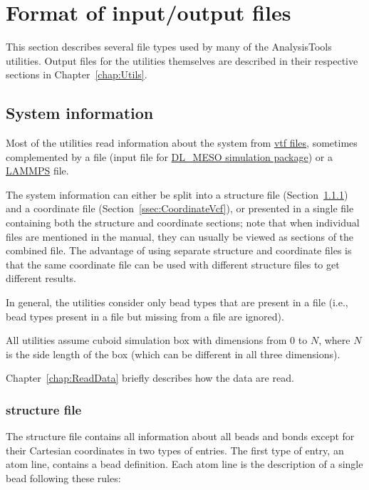 \chapter{Format of input/output files}\label{chap:input}

This section describes several file types used by many of the
AnalysisTools utilities. Output files for the utilities themselves are
described in their respective sections in Chapter~\ref{chap:Utils}.

\section{System information} %
Most of the utilities read information about the system from
\href{https://github.com/olenz/vtfplugin/wiki/VTF-format}{vtf files},
sometimes complemented by a \field file (input file for
\href{https://www.scd.stfc.ac.uk/Pages/DL_MESO.aspx}{DL\_MESO
simulation package}) or a \href{https://lammps.sandia.gov/}{LAMMPS}
\data file.

The system information can either be split into a \vsf structure file
(Section~\ref{ssec:StructureVsf}) and a \vcf coordinate file
(Section~\ref{ssec:CoordinateVcf}), or presented in a single \vtf file
containing both the structure and coordinate sections; note that when
individual \vscf files are mentioned in the manual, they can usually be
viewed as \vscf sections of the combined \vtf file. The advantage of
using separate structure and coordinate files is that the same coordinate
file can be used with different structure files to get different results.

In general, the utilities consider only bead types that are present in a
\vcf file (i.e., bead types present in a \vsf file but missing from a \vcf
file are ignored).

All utilities assume cuboid simulation box with dimensions from 0 to $N$,
where $N$ is the side length of the box (which can be different in all
three dimensions).

Chapter~\ref{chap:ReadData} briefly describes how the data are read.

\subsection{\vsf structure file} \label{ssec:StructureVsf} %

The structure file contains all information about all beads and bonds
except for their Cartesian coordinates in two types of entries. The first
type of entry, an atom line, contains a bead definition. Each atom line is
the description of a single bead following these rules:

